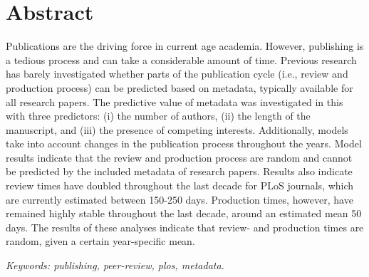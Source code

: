 \section*{Abstract}
Publications are the driving force in current age academia. However, publishing is a tedious process and can take a considerable amount of time. Previous research has barely investigated whether parts of the publication cycle (i.e., review and production process) can be predicted based on metadata, typically available for all research papers. The predictive value of metadata was investigated in this with three predictors: (i) the number of authors, (ii) the length of the manuscript, and (iii) the presence of competing interests. Additionally, models take into account changes in the publication process throughout the years. Model results indicate that the review and production process are random and cannot be predicted by the included metadata of research papers. Results also indicate review times have doubled throughout the last decade for PLoS journals, which are currently estimated between 150-250 days. Production times, however, have remained highly stable throughout the last decade, around an estimated mean 50 days. The results of these analyses indicate that review- and production times are random, given a certain year-specific mean.
  
\textit{Keywords: publishing, peer-review, plos, metadata.}